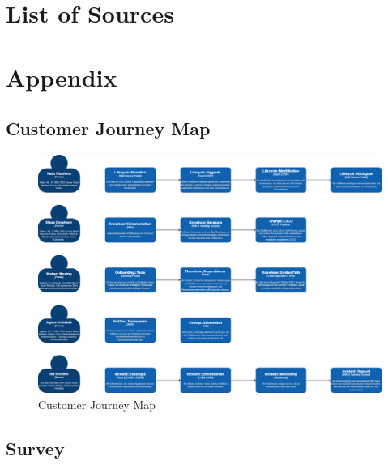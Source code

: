 \documentclass[a4paper,12pt]{article}
\begin{document}
    \pagebreak


    \section{List of Sources}
    \label{sec:bibliograhpy}
    \printbibliography[heading=none]


    \section{Appendix}
    \label{sec:appendix}

    \subsection{Customer Journey Map}
    \label{subsec:cusjourmap}
    \begin{figure}
        \includegraphics[angle=270,origin=c,width=\linewidth]{customer-journey.png}
        \caption{Customer Journey Map}
        \label{fig:customerjourney}
    \end{figure}

    \subsection{Survey}
    \label{subsec:survey}
\end{document}
